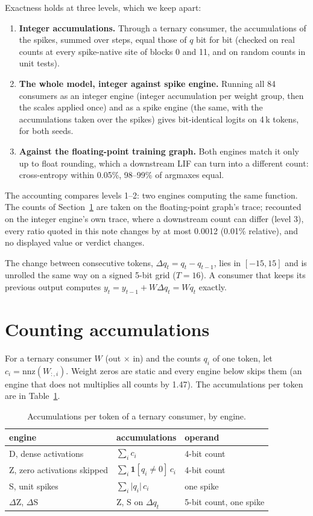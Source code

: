 \documentclass[11pt]{article}
\newcommand{\x}{$\times$}
\begin{document}
Exactness holds at three levels, which we keep apart:
\begin{enumerate}
\item \textbf{Integer accumulations.} Through a ternary consumer, the accumulations of the
  spikes, summed over steps, equal those of $q$ bit for bit (checked on real counts at every
  spike-native site of blocks 0 and 11, and on random counts in unit tests).
\item \textbf{The whole model, integer against spike engine.} Running all 84 consumers as an
  integer engine (integer accumulation per weight group, then the scales applied once) and as a
  spike engine (the same, with the accumulations taken over the spikes) gives bit-identical
  logits on 4\,k tokens, for both seeds.
\item \textbf{Against the floating-point training graph.} Both engines match it only up to float
  rounding, which a downstream LIF can turn into a different count: cross-entropy within 0.05\%,
  98--99\% of argmaxes equal.
\end{enumerate}
The accounting compares levels 1--2: two engines computing the same function. The counts of
Section~\ref{sec:counting} are taken on the floating-point graph's trace; recounted on the integer
engine's own trace, where a downstream count can differ (level 3), every ratio quoted in this note
changes by at most 0.0012 (0.01\% relative), and no displayed value or verdict changes.

The change between consecutive tokens, $\Delta q_t = q_t - q_{t-1}$, lies in $[-15, 15]$ and is
unrolled the same way on a signed 5-bit grid ($T = 16$). A consumer that keeps its previous
output computes $y_t = y_{t-1} + W \Delta q_t = W q_t$ exactly.

\section{Counting accumulations}
\label{sec:counting}

For a ternary consumer $W$ (out \x{} in) and the counts $q_i$ of one token, let
$c_i = \mathrm{nnz}(W_{:,i})$. Weight zeros are static and every engine below skips them (an
engine that does not multiplies all counts by 1.47). The accumulations per token are in
Table~\ref{tab:engines}.

\begin{table}[t]
\centering\small
\caption{Accumulations per token of a ternary consumer, by engine.}
\label{tab:engines}
\begin{tabular}{@{}lll@{}}
\toprule
engine & accumulations & operand \\
\midrule
D, dense activations & $\sum_i c_i$ & 4-bit count \\
Z, zero activations skipped & $\sum_i \mathbf{1}[q_i \neq 0]\, c_i$ & 4-bit count \\
S, unit spikes & $\sum_i \lvert q_i \rvert\, c_i$ & one spike \\
$\Delta$Z, $\Delta$S & Z, S on $\Delta q_t$ & 5-bit count, one spike \\
\bottomrule
\end{tabular}
\end{table}
\end{document}
